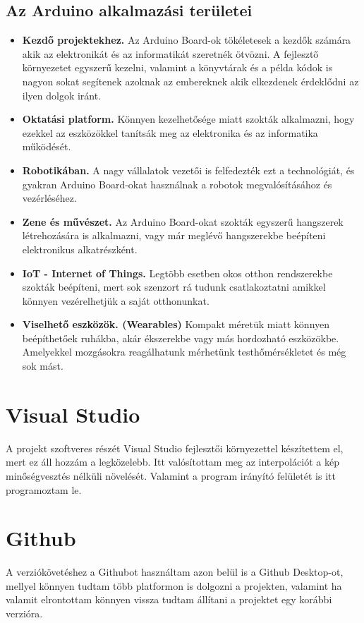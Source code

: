 \documentclass[]{thesis-ekf}
\theoremstyle{definition}
\theoremstyle{remark}
\begin{document}
\subsection{Az Arduino alkalmazási területei}
\begin{itemize}
	\item \textbf{Kezdő projektekhez.} Az Arduino Board-ok tökéletesek a kezdők számára akik az elektronikát és az informatikát szeretnék ötvözni. A fejlesztő környezetet egyszerű kezelni, valamint a könyvtárak és a példa kódok is nagyon sokat segítenek azoknak az embereknek akik elkezdenek érdeklődni az ilyen dolgok iránt.
	\item \textbf{Oktatási platform.} Könnyen kezelhetősége miatt szokták alkalmazni, hogy ezekkel az eszközökkel tanítsák meg az elektronika és az informatika működését.
	\item \textbf{Robotikában.} A nagy vállalatok vezetői is felfedezték ezt a technológiát, és gyakran Arduino Board-okat használnak a robotok megvalósításához és vezérléséhez.
	\item \textbf{Zene és művészet.} Az Arduino Board-okat szokták egyszerű hangszerek létrehozására is alkalmazni, vagy már meglévő hangszerekbe beépíteni elektronikus alkatrészként.
	\item \textbf{IoT - Internet of Things.} Legtöbb esetben okos otthon rendszerekbe szokták beépíteni, mert sok szenzort rá tudunk csatlakoztatni amikkel könnyen vezérelhetjük a saját otthonunkat. 
	\item \textbf{Viselhető eszközök. (Wearables)} Kompakt méretük miatt könnyen beépíthetőek ruhákba, akár ékszerekbe vagy más hordozható eszközökbe. Amelyekkel mozgásokra reagálhatunk mérhetünk testhőmérsékletet és még sok mást.
\end{itemize}
\section{Visual Studio}
A projekt szoftveres részét Visual Studio\cite{visual-studio} fejlesztői környezettel készítettem el, mert ez áll hozzám a legközelebb. Itt valósítottam meg az interpolációt a kép minőségvesztés nélküli növelését. Valamint a program irányító felületét is itt programoztam le. 
\section{Github}
A verziókövetéshez a Githubot\cite{github} használtam azon belül is a Github Desktop-ot, mellyel könnyen tudtam több platformon is dolgozni a projekten, valamint ha valamit elrontottam könnyen vissza tudtam állítani a projektet egy korábbi verzióra.
\end{document}

